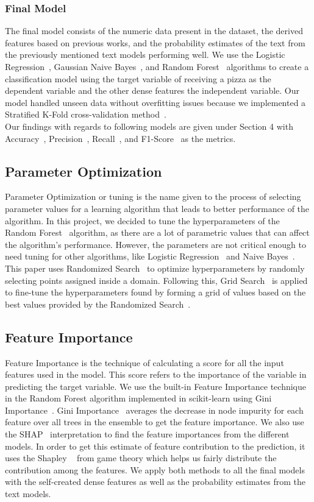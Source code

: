 \documentclass[runningheads]{llncs}
\begin{document}
\subsubsection{Final Model}
The final model consists of the numeric data present in the dataset, the derived features based on previous works, and the probability estimates of the text from the previously mentioned text models performing well. We use the Logistic Regression~\cite{lr}, Gaussian Naive Bayes~\cite{nb}, and Random Forest~\cite{rf} algorithms to create a classification model using the target variable of receiving a pizza as the dependent variable and the other dense features the independent variable. Our model handled unseen data without overfitting issues because we implemented a Stratified K-Fold cross-validation method~\cite{strat_kfold}.\\
 Our findings with regards to following models are given under Section 4 with Accuracy~\cite{metrics}, Precision~\cite{metrics}, Recall~\cite{metrics}, and F1-Score~\cite{metrics} as the metrics.

\subsection{Parameter Optimization} 
Parameter Optimization or tuning is the name given to the process of selecting parameter values for a learning algorithm that leads to better performance of the algorithm. In this project, we decided to tune the hyperparameters of the Random Forest~\cite{rf} algorithm, as there are a lot of parametric values that can affect the algorithm's performance. However, the parameters are not critical enough to need tuning for other algorithms, like Logistic Regression~\cite{lr} and Naive Bayes~\cite{nb}. This paper uses Randomized Search~\cite{rand_search} to optimize hyperparameters by randomly selecting points assigned inside a domain. Following this, Grid Search~\cite{rand_search} is applied to fine-tune the hyperparameters found by forming a grid of values based on the best values provided by the Randomized Search~\cite{rand_search}.
\subsection{Feature Importance}
Feature Importance is the technique of calculating a score for all the input features used in the model. This score refers to the importance of the variable in predicting the target variable.
We use the built-in Feature Importance technique in the Random Forest algorithm implemented in scikit-learn using Gini Importance~\cite{gini}. Gini Importance~\cite{gini} averages the decrease in node impurity for each feature over all trees in the ensemble to get the feature importance. We also use the SHAP~\cite{shap} interpretation to find the feature importances from the different models. In order to get this estimate of feature contribution to the prediction, it uses the Shapley ~\cite{shap} from game theory which helps us fairly distribute the contribution among the features. We apply both methods to all the final models with the self-created dense features as well as the probability estimates from the text models.
\end{document}
